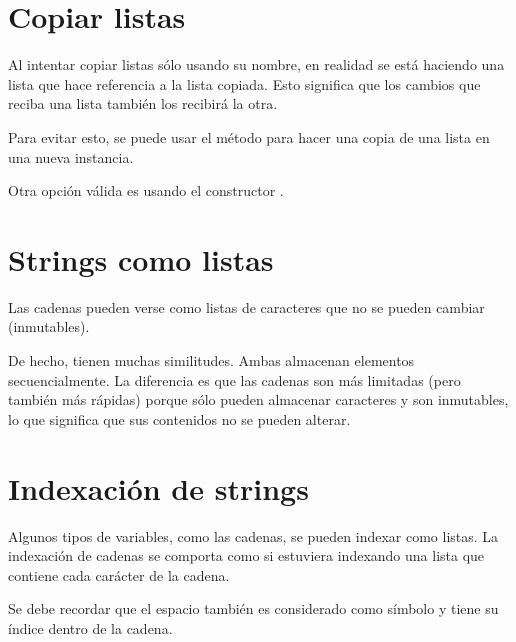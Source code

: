 \section{Copiar listas}

Al intentar copiar listas sólo usando su nombre, en realidad se está haciendo una lista que hace referencia a la lista copiada. Esto significa que los cambios que reciba una lista también los recibirá la otra.


Para evitar esto, se puede usar el método  para hacer una copia de una lista en una nueva instancia.


Otra opción válida es usando el constructor .


\section{Strings como listas}

Las cadenas pueden verse como listas de caracteres que no se pueden cambiar (inmutables).


De hecho, tienen muchas similitudes. Ambas almacenan elementos secuencialmente. La diferencia es que las cadenas son más limitadas (pero también más rápidas) porque sólo pueden almacenar caracteres y son inmutables, lo que significa que sus contenidos no se pueden alterar.

\section{Indexación de strings}

Algunos tipos de variables, como las cadenas, se pueden indexar como listas. La indexación de cadenas se comporta como si estuviera indexando una lista que contiene cada carácter de la cadena.


Se debe recordar que el espacio \ttt{\qq  \qq} también es considerado como símbolo y tiene su índice dentro de la cadena.\smallskip


